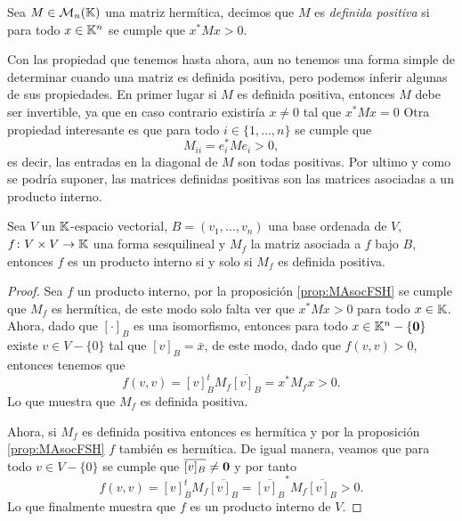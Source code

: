 \begin{defi}
  Sea $M \in \mathcal{M}_n(\mathbb{K})$ una matriz hermítica, decimos que $M$ es \emph{definida positiva} si para todo $x \in \mathbb{K}^n$ se cumple que $x^* M x > 0$.
\end{defi}

Con las propiedad que tenemos hasta ahora, aun no tenemos una forma simple de determinar cuando una matriz es definida positiva, pero podemos inferir algunas de sus propiedades. En primer lugar si $M$ es definida positiva, entonces $M$ debe ser invertible, ya que en caso contrario existiría $x \neq 0$ tal que $x^* M x = 0$ Otra propiedad interesante es que para todo $i \in \{1,\ldots,n\}$ se cumple que
\[
  M_{ii} = e_i^* M e_i > 0,
\]
es decir, las entradas en la diagonal de $M$ son todas positivas. Por ultimo y como se podría suponer, las matrices definidas positivas son las matrices asociadas a un producto interno.

\begin{teor}
  Sea $V$ un $\mathbb{K}$-espacio vectorial, $B = (v_1,\ldots,v_n)$ una base ordenada de $V$, $f\colon V\times V \to\mathbb{K}$ una forma sesquilineal y $M_f$ la matriz asociada a $f$ bajo $B$, entonces $f$ es un producto interno si y solo si $M_f$ es definida positiva.
\end{teor}
\begin{proof}
  Sea $f$ un producto interno, por la proposición \ref{prop:MAsocFSH} se cumple que $M_f$ es hermítica, de este modo solo falta ver que $x^* M x > 0$ para todo $x \in \mathbb{K}$. Ahora, dado que $[\cdot]_B$ es una isomorfismo, entonces para todo $x \in \mathbb{K}^n-\{\mathbf{0}\}$ existe $v \in V - \{0\}$ tal que $[v]_B = \bar x$, de este modo, dado que $f(v,v)>0$, entonces tenemos que
  \[
    f(v,v) = [v]_B^t M_f \overline{[v]_B} = x^* M_f x > 0.
  \]
  Lo que muestra que $M_f$ es definida positiva.

  Ahora, si $M_f$ es definida positiva entonces es hermítica y por la proposición \ref{prop:MAsocFSH} $f$ también es hermítica. De igual manera, veamos que para todo $v\in V - \{0\}$ se cumple que $\overline{[v]_B} \neq \mathbf{0}$ y por tanto
  \[
    f(v,v) = [v]_B^t M_f \overline{[v]_B} = \overline{[v]_B}^* M_f \overline{[v]_B} > 0.
  \]
  Lo que finalmente muestra que $f$ es un producto interno de $V$.
\end{proof}